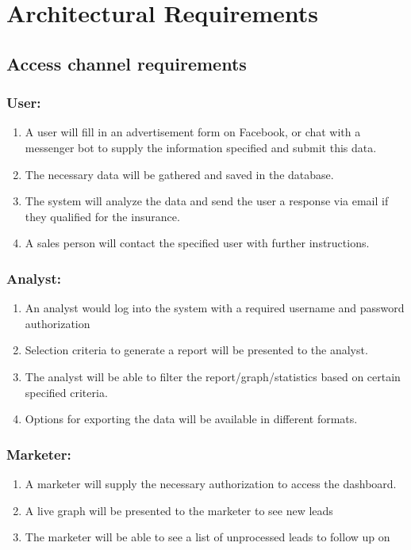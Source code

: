 \documentclass{article}
\begin{document}
\section{Architectural Requirements}
	\subsection{Access channel requirements}
\subsubsection{User:}
	\begin{enumerate}
		\item A user will fill in an advertisement form on Facebook, or chat with a messenger bot to supply the information specified and submit this data.
		\item The necessary data will be gathered and saved in the database.
		\item The system will analyze the data and send the user a response via email if they qualified for the insurance.
		\item A sales person will contact the specified user with further instructions.
	\end{enumerate}
\subsubsection{Analyst:}
	\begin{enumerate}
		\item An analyst would log into the system with a required username and password authorization
		\item Selection criteria to generate a report will be presented to the analyst.
		\item The analyst will be able to filter the report/graph/statistics based on certain specified criteria.
		\item Options for exporting the data will be available in different formats.
	\end{enumerate}
\subsubsection{Marketer:}
	\begin{enumerate}
		\item A marketer will supply the necessary  authorization to access the dashboard.
		\item A live graph will be presented to the marketer to see new leads
		\item The marketer will be able to see a list of unprocessed leads to follow up on
	\end{enumerate}	
\end{document}
